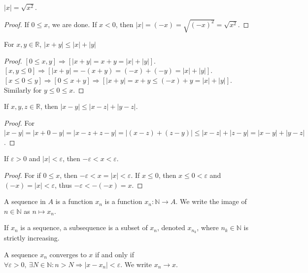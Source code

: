\documentclass[crop=false,class=book,oneside]{standalone}
\begin{document}
            \begin{theorem}
            $|x| = \sqrt{x^2}$.
            \end{theorem}
            \begin{proof}
            If $0 \leq x$, we are done. If $x<0$, then $|x| = (-x) = \sqrt{(-x)^2} = \sqrt{x^2}$.
            \end{proof}
            \begin{theorem}
            For $x,y \in \mathbb{R}$, $|x+y|\leq |x|+|y|$
            \end{theorem}
            \begin{proof}
            $[0\leq x,y]\Rightarrow [|x+y| = x+y = |x|+|y|]$. $[x,y\leq 0]\Rightarrow [|x+y| = -(x+y) = (-x)+(-y)=|x|+|y|]$. $[x\leq 0 \leq y]\Rightarrow [0\leq x+y]\Rightarrow [|x+y| = x+y \leq (-x)+y=|x|+|y|]$. Similarly for $y\leq 0 \leq x$.
            \end{proof}
            \begin{corollary}
            If $x,y,z\in \mathbb{R}$, then $|x-y| \leq |x-z|+|y-z|$.
            \end{corollary}
            \begin{proof}
            For $|x-y| = |x+ 0 - y| = |x-z+z-y| = |(x-z)+(z-y)| \leq |x-z|+|z-y| = |x-y|+|y-z|$.
            \end{proof}
            \begin{corollary}
            If $\varepsilon >0$ and $|x|<\varepsilon$, then $-\varepsilon < x < \varepsilon$.
            \end{corollary}
            \begin{proof}
            For if $0\leq x$, then $-\varepsilon< x=|x|< \varepsilon$. If $x\leq 0$, then $x\leq 0<\varepsilon$ and $(-x)=|x|<\varepsilon$, thus $-\varepsilon < -(-x) = x$.
            \end{proof}
            \begin{definition}
            A sequence in $A$ is a function $x_n$ is a function $x_n:\mathbb{N}\rightarrow A$. We write the image of $n\in \mathbb{N}$ as $n\mapsto x_n$.
            \end{definition}
            \begin{definition}
            If $x_n$ is a sequence, a subsequence is a subset of $x_n$, denoted $x_{n_k}$, where $n_k\in \mathbb{N}$ is strictly increasing.
            \end{definition}
            \begin{definition}
            A sequence $x_n$ converges to $x$ if and only if $\forall \varepsilon>0,\ \exists N\in \mathbb{N}: n>N\Rightarrow |x-x_n|<\varepsilon$. We write $x_n \rightarrow x$.
            \end{definition}
\end{document}
